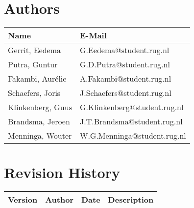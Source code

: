 \section*{Authors}

\begin{tabular}{ l l }
    \textbf{Name} & \textbf{E-Mail} \\ \hline
	Gerrit, Eedema & G.Eedema@student.rug.nl\\
	Putra, Guntur & G.D.Putra@student.rug.nl\\
	Fakambi, Aurélie & A.Fakambi@student.rug.nl\\
	Schaefers, Joris & J.Schaefers@student.rug.nl\\
	Klinkenberg, Guus & G.Klinkenberg@student.rug.nl\\
	Brandsma, Jeroen & J.T.Brandsma@student.rug.nl\\
	Menninga, Wouter & W.G.Menninga@student.rug.nl\\ \hline
\end{tabular}

\section*{Revision History}
\begin{tabularx}{\textwidth}{ l l l l}
    \textbf{Version} & \textbf{Author} &  \textbf{Date} & \textbf{Description}\\ \hline
\end{tabularx}